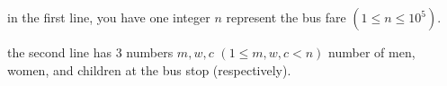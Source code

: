 in the first line, you have one integer $n$ represent the bus fare $(1 ≤ n ≤ 10^5)$.

the second line has 3 numbers $m, w, c$ $(1 ≤ m, w, c < n)$ number of men, women, and children at the bus stop (respectively).